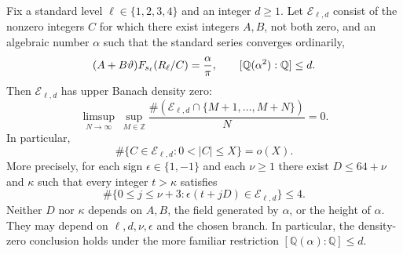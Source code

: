 \begin{theorem}
\label{thm:C-density-zero}
Fix a standard level $\ell\in\{1,2,3,4\}$ and an integer $d\geq1$.
Let $\mathcal E_{\ell,d}$ consist of the nonzero integers $C$ for
which there exist integers $A,B$, not both zero, and an algebraic
number $\alpha$ such that the standard series converges ordinarily,
\[
 (A+B\vartheta)F_{s_\ell}(R_\ell/C)=\frac{\alpha}{\pi},
 \qquad [\mathbb Q(\alpha^2):\mathbb Q]\leq d.
\]
Then $\mathcal E_{\ell,d}$ has upper Banach density zero:
\[
 \limsup_{N\to\infty}\ \sup_{M\in\mathbb Z}
 \frac{\#(\mathcal E_{\ell,d}\cap\{M+1,\ldots,M+N\})}{N}=0.
\]
In particular,
\[
 \#\{C\in\mathcal E_{\ell,d}:0<|C|\leq X\}=o(X).
\]
More precisely, for each sign $\epsilon\in\{1,-1\}$ and each
$\nu\geq1$ there exist $D\leq64+\nu$ and $\kappa$ such that every
integer $t>\kappa$ satisfies
\[
 \#\{0\leq j\leq\nu+3:
       \epsilon(t+jD)\in\mathcal E_{\ell,d}\}\leq4.
\]
Neither $D$ nor $\kappa$ depends on $A,B$, the field generated by
$\alpha$, or the height of $\alpha$.  They may depend on
$\ell,d,\nu,\epsilon$ and the chosen branch.  In particular, the
density-zero conclusion holds under the more familiar restriction
$[\mathbb Q(\alpha):\mathbb Q]\leq d$.
\end{theorem}

